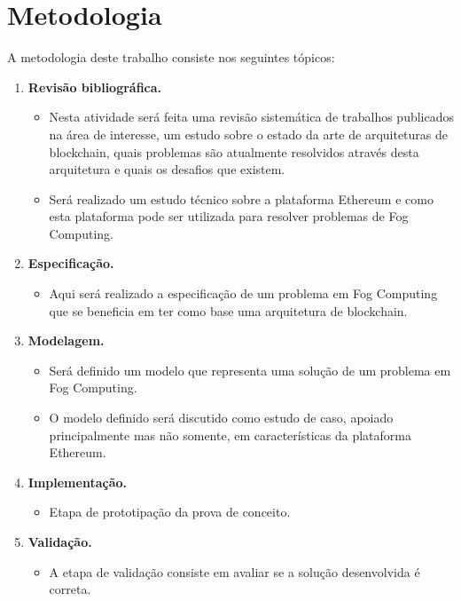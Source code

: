 \documentclass[tcc-proposta]{texufpel}
\begin{document}
	
\chapter{Metodologia}
A metodologia deste trabalho consiste nos seguintes tópicos:
	
\begin{enumerate}
	\item \textbf{Revisão bibliográfica.} 
 \begin{itemize}   
   \item  Nesta atividade será feita uma revisão sistemática de trabalhos publicados na área de interesse, um estudo sobre o estado da arte de arquiteturas de blockchain, quais problemas são atualmente resolvidos através desta arquitetura e quais os desafios que existem. 
   \item Será realizado um estudo técnico sobre a plataforma Ethereum e como esta plataforma pode ser utilizada para resolver problemas de Fog Computing.
\end{itemize}	
	\item \textbf{Especificação.} 
    
    \begin{itemize}   
   \item Aqui será realizado a especificação de um problema em Fog Computing que se beneficia em ter como base uma arquitetura de blockchain.
\end{itemize}		
	\item \textbf{Modelagem.} 
   \begin{itemize}   
   \item      Será definido um modelo que representa uma solução de um problema em Fog Computing. 
   \item O modelo definido  será discutido como estudo de caso, apoiado principalmente mas não somente, em características da plataforma Ethereum.
	\end{itemize}
	\item \textbf{Implementação.} 
 \begin{itemize}   
   \item      Etapa de prototipação da prova de conceito. 
	\end{itemize}
	\item \textbf{Validação.} 
    
    \begin{itemize}   
   \item
    A etapa de validação consiste em avaliar se a solução desenvolvida é correta.
  
    \end{itemize}
\end{enumerate}
	
\end{document}
